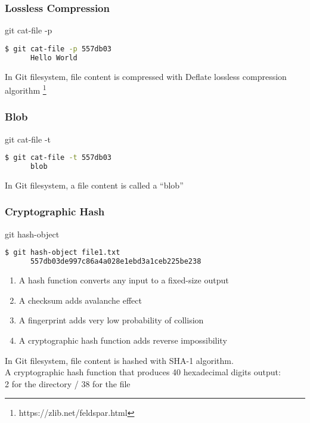 \begin{frame}[fragile]\frametitle{Lossless Compression}
   \begin{center}
      \Huge git cat-file -p \normalsize
   \end{center}
   \begin{lstlisting}[language=bash, style=bash]
      $ git cat-file -p 557db03
      Hello World
   \end{lstlisting}
   \vspace{1em}
   In Git filesystem, file content is compressed with Deflate lossless compression algorithm
   \footnote{https://zlib.net/feldspar.html}
\end{frame}

\begin{frame}[fragile]\frametitle{Blob}
   \begin{center}
      \Huge git cat-file -t \normalsize
   \end{center}
   \begin{lstlisting}[language=bash, style=bash]
      $ git cat-file -t 557db03
      blob
   \end{lstlisting}
   \vspace{1em}
   \begin{center}
      In Git filesystem, a file content is called a ``blob''
   \end{center}
\end{frame}

\begin{frame}[fragile]\frametitle{Cryptographic Hash}
   \begin{center}
      \Huge git hash-object \normalsize
   \end{center}
   \begin{lstlisting}[language=bash, style=bash]
      $ git hash-object file1.txt
      557db03de997c86a4a028e1ebd3a1ceb225be238
   \end{lstlisting}
   \vspace{1em}
   \begin{enumerate}
      \item A hash function converts any input to a fixed-size output
      \item A checksum adds avalanche effect
      \item A fingerprint adds very low probability of collision
      \item A cryptographic hash function adds reverse impossibility
   \end{enumerate}
   \vspace{1em}
   In Git filesystem, file content is hashed with SHA-1 algorithm. \\
   A cryptographic hash function that produces 40 hexadecimal digits output: \\
   2 for the directory / 38 for the file
\end{frame}

